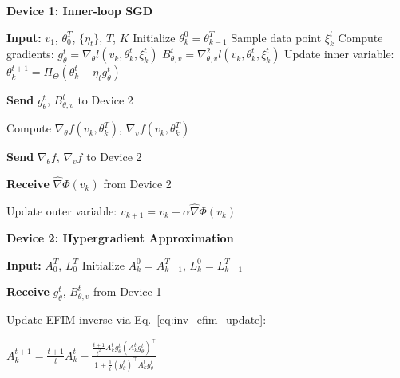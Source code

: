 \documentclass[11 pt]{article}
\begin{document}
\begin{algorithm*}[htbp]
    \caption{Parallel Natural Hypergradient Descent}
    \label{alg:parallel_nhgd}
    \begin{minipage}[t]{0.48\textwidth}
        \textbf{Device 1: Inner-loop SGD}
        \begin{algorithmic}[1]
        \STATE \textbf{Input:} $v_1$, $\theta_0^T$, $\{\eta_t\}$, $T$, $K$
            \STATE Initialize $\theta_k^{0}=\theta_{k-1}^{T}$
                \STATE Sample data point $\xi_k^t$
                \STATE Compute gradients:
                \STATE \quad $g_{\theta}^t = \nabla_\theta l (v_k,\theta_k^t,\xi_k^t)$
                \STATE \quad $B_{\theta,v}^t = \nabla_{\theta,v}^2 l (v_k,\theta_k^t, \xi_k^t)$
                \STATE Update inner variable:
                \STATE \quad $\theta_{k}^{t+1} = \Pi_{\Theta} \left(\theta_k^t - \eta_t g_{\theta}^t\right)$
                \STATE \colorbox{yellow!20}{\parbox{\dimexpr\linewidth-2\fboxsep}{\strut \textbf{Send} $g_{\theta}^t$, $B_{\theta,v}^t$ to Device 2\strut}}
            \ENDFOR
            \STATE Compute $\nabla_\theta f(v_k, \theta_k^T)$, $\nabla_v f(v_k, \theta_k^T)$
            \STATE \colorbox{yellow!20}{\parbox{\dimexpr\linewidth-2\fboxsep}{\strut \textbf{Send} $\nabla_\theta f$, $\nabla_v f$ to Device 2\strut}}
            \STATE \colorbox{green!20}{\parbox{\dimexpr\linewidth-2\fboxsep}{\strut \textbf{Receive} $\widehat{\nabla} \Phi(v_k)$ from Device 2\strut}}
            \STATE Update outer variable:
            \STATE \quad $v_{k+1} = v_k - \alpha \widehat{\nabla} \Phi(v_k)$
        \ENDFOR
        \end{algorithmic}
    \end{minipage}
    \hfill
    \begin{minipage}[t]{0.48\textwidth}
\textbf{Device 2: Hypergradient Approximation}
        \begin{algorithmic}[1]
        \STATE \textbf{Input:} $A_0^T$, $L_0^{T}$
            \STATE Initialize $A_k^0=A_{k-1}^T$, $L_k^0=L_{k-1}^T$
                \STATE \colorbox{green!20}{\parbox{\dimexpr\linewidth-2\fboxsep}{\strut \textbf{Receive} $g_{\theta}^t$, $B_{\theta,v}^t$ from Device 1\strut}}
                \STATE \colorbox{cyan!15}{\parbox{\dimexpr\linewidth-2\fboxsep}{\strut Update EFIM inverse via Eq.~\eqref{eq:inv_efim_update}:\strut}}
                \STATE \colorbox{cyan!15}{\parbox{\dimexpr\linewidth-2\fboxsep}{
                $A_k^{t+1}=\frac{t+1}{t}A_k^{t} - \frac{\frac{t+1}{{t}^2}A_k^{t}g_{\theta}^t\left(A_k^{t}g_{\theta}^t\right)^\top}{1+\frac{1}{t}(g_{\theta}^t)^\top A_k^{t}g_{\theta}^t}$
}}
\end{algorithmic}
\end{minipage}
\end{algorithm*}
\end{document}
